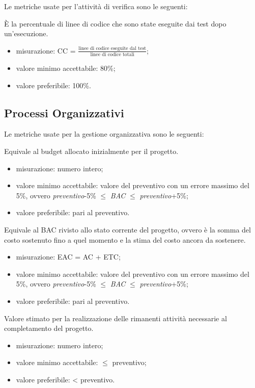 	Le metriche usate per l'attività di verifica sono le seguenti:
	
		 È la percentuale di linee di codice che sono state eseguite dai test dopo un’esecuzione.
		 \begin{itemize}
			\item{misurazione: CC = $\displaystyle\frac{\mbox{linee di codice eseguite dal test}}{\mbox{linee di codice totali}}$;}
			\item{valore minimo accettabile: 80\%;}
			\item{valore preferibile: 100\%.}
		\end{itemize}

\subsection{Processi Organizzativi}

	Le metriche usate per la gestione organizzativa sono le seguenti:
	
		Equivale al budget allocato inizialmente per il progetto.
		\begin{itemize}
			\item{misurazione: numero intero;}
			\item{valore minimo accettabile: valore del preventivo con un errore massimo del 5\%, ovvero \textit{preventivo}-5\% $\leq$ \textit{BAC} $\leq$ \textit{preventivo}+5\%;}
			\item{valore preferibile: pari al preventivo.}
		\end{itemize}
		
		Equivale al BAC rivisto allo stato corrente del progetto, ovvero è la somma del costo sostenuto fino a quel momento e la stima del costo ancora da sostenere.
		\begin{itemize}
			\item{misurazione: EAC = AC + ETC;}
			\item{valore minimo accettabile: valore del preventivo con un errore massimo del 5\%, ovvero \textit{preventivo}-5\% $\leq$ \textit{BAC} $\leq$ \textit{preventivo}+5\%;}
			\item{valore preferibile: pari al preventivo.}
		\end{itemize}
		
		Valore stimato per la realizzazione delle rimanenti attività necessarie al completamento del progetto.
		\begin{itemize}
			\item{misurazione: numero intero;}
			\item{valore minimo accettabile: $\leq$ preventivo;}
			\item{valore preferibile: < preventivo.}
		\end{itemize}
		
